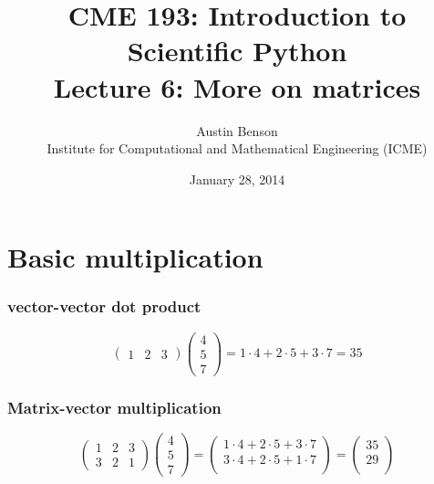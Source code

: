 \documentclass{beamer}
\title{CME 193: Introduction to Scientific Python \\
Lecture 6: More on matrices}
\author{
Austin Benson \\
\vspace{0.1in}
Institute for Computational and Mathematical Engineering (ICME)}
\date{January 28, 2014}
\begin{document}
\maketitle

\section{Basic multiplication}

\begin{frame}
\frametitle{vector-vector dot product}

\[
\begin{pmatrix}
1 & 2 & 3 
\end{pmatrix}
\begin{pmatrix}
4 \\ 5 \\ 7
\end{pmatrix}
= 1 \cdot 4 + 2 \cdot 5 + 3 \cdot 7 = 35
\]


\end{frame}

\begin{frame}
\frametitle{Matrix-vector multiplication}

\[
\begin{pmatrix}
1 & 2 & 3  \\
3 & 2 & 1
\end{pmatrix}
\begin{pmatrix}
4 \\ 5 \\ 7
\end{pmatrix}
= \begin{pmatrix}
1 \cdot 4 + 2 \cdot 5 + 3 \cdot 7 \\
3 \cdot 4 + 2 \cdot 5 + 1 \cdot 7 \\
\end{pmatrix}
= \begin{pmatrix}
35 \\
29 \\
\end{pmatrix}
\]


\end{frame}
\end{document}

